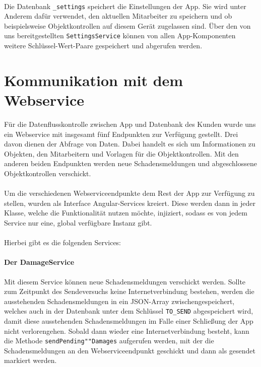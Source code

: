 \documentclass[12pt]{article}
\begin{document}
\paragraph{}Die Datenbank \texttt{\_settings} speichert die Einstellungen der App. Sie wird unter Anderem dafür verwendet, den aktuellen Mitarbeiter zu speichern und ob beispielsweise Objektkontrollen auf diesem Gerät zugelassen sind. Über den von uns bereitgestellten \texttt{SettingsService} können von allen App-Komponenten weitere Schlüssel-Wert-Paare gespeichert und abgerufen werden.

\section{Kommunikation mit dem Webservice}
Für die Datenflusskontrolle zwischen App und Datenbank des Kunden wurde uns ein Webservice mit insgesamt fünf Endpunkten zur Verfügung gestellt. Drei davon dienen der Abfrage von Daten. Dabei handelt es sich um Informationen zu Objekten, den Mitarbeitern und Vorlagen für die Objektkontrollen. Mit den anderen beiden Endpunkten werden neue Schadensmeldungen und abgeschlossene Objektkontrollen verschickt.

\paragraph{}Um die verschiedenen Webserviceendpunkte dem Rest der App zur Verfügung zu stellen, wurden als Interface Angular-Services kreiert. Diese werden dann in jeder Klasse, welche die Funktionalität nutzen möchte, injiziert, sodass es von jedem Service nur eine, global verfügbare Instanz gibt.\\ \ \\
Hierbei gibt es die folgenden Services:
\paragraph{Der DamageService}
Mit diesem Service können neue Schadensmeldungen verschickt werden. Sollte zum Zeitpunkt des Sendeversuchs keine Internetverbindung bestehen, werden die ausstehenden Schadensmeldungen in ein JSON-Array zwischengespeichert, welches auch in der Datenbank unter dem Schlüssel \texttt{TO\_SEND} abgespeichert wird, damit diese ausstehenden Schadensmeldungen im Falle einer Schließung der App nicht verlorengehen. Sobald dann wieder eine Internetverbindung besteht, kann die Methode \texttt{sendPending""Damages} aufgerufen werden, mit der die Schadensmeldungen an den Webserviceendpunkt geschickt und dann als gesendet markiert werden.
\end{document}
